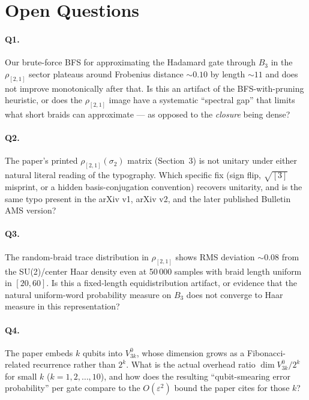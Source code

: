 \documentclass[11pt]{article}
\begin{document}
\section{Open Questions}

\paragraph{Q1.} Our brute-force BFS for approximating the Hadamard gate through $B_3$ in the $\rho_{[2,1]}$ sector plateaus around Frobenius distance $\sim 0.10$ by length $\sim 11$ and does not improve monotonically after that. Is this an artifact of the BFS-with-pruning heuristic, or does the $\rho_{[2,1]}$ image have a systematic ``spectral gap'' that limits what short braids can approximate --- as opposed to the \emph{closure} being dense?

\paragraph{Q2.} The paper's printed $\rho_{[2,1]}(\sigma_2)$ matrix (Section~3) is not unitary under either natural literal reading of the typography. Which specific fix (sign flip, $\sqrt{[3]}$ misprint, or a hidden basis-conjugation convention) recovers unitarity, and is the same typo present in the arXiv v1, arXiv v2, and the later published Bulletin AMS version?

\paragraph{Q3.} The random-braid trace distribution in $\rho_{[2,1]}$ shows RMS deviation $\sim 0.08$ from the SU(2)/center Haar density even at 50\,000 samples with braid length uniform in $[20, 60]$. Is this a fixed-length equidistribution artifact, or evidence that the natural uniform-word probability measure on $B_3$ does not converge to Haar measure in this representation?

\paragraph{Q4.} The paper embeds $k$ qubits into $V^0_{3k}$, whose dimension grows as a Fibonacci-related recurrence rather than $2^k$. What is the actual overhead ratio $\dim V^0_{3k}/2^k$ for small $k$ ($k = 1, 2, \ldots, 10$), and how does the resulting ``qubit-smearing error probability'' per gate compare to the $O(\varepsilon^2)$ bound the paper cites for those $k$?
\end{document}
